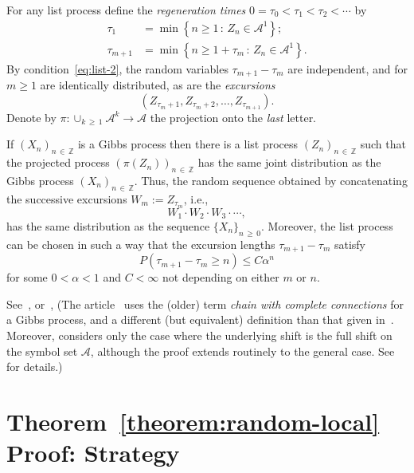 \documentclass[AHL, Unicode, longabstracts, published]{cedram}
\newcommand{\zz}[1]{\mathbb #1}
\begin{document}
For any list process define the \emph{regeneration times} $0=\tau_{0}<\tau_{1}<\tau_{2}<\dotsb$ by
\begin{align*}
\tau_{1}&=\min \left\{n\geq 1\,:\, Z_{n}\in \mathcal{A}^{1}\right\};\\
\tau_{m+1}&=\min \left\{n\geq 1+\tau_{m}\,:\, Z_{n}\in \mathcal{A}^{1}\right\}.
\end{align*}
By condition~\eqref{eq:list-2}, the random variables $\tau_{m+1}-\tau_{m}$ are independent, and for $m\geq 1$ are identically distributed, as are the \emph{excursions}
\[
\left(Z_{\tau_{m}+1},Z_{\tau_{m}+2},\dotsc,Z_{\tau_{m+1}}\right).
\]
Denote by $\pi :\cup_{k\,\geq\,1}\mathcal{A}^{k} \rightarrow \mathcal{A}$ the projection onto the \emph{last} letter.

\begin{prop}\label{proposition:regeneration}
If $(X_{n})_{n\,\in\,\zz{Z}}$ is a Gibbs process then there is a list process $(Z_{n})_{n\,\in\,\zz{Z}}$ such that the projected process $(\pi (Z_{n}))_{n\,\in\,\zz{Z}}$ has the same joint distribution as the Gibbs process $(X_{n})_{n\,\in\,\zz{Z}}$. Thus, the random sequence obtained by concatenating the successive excursions $W_{m}:=Z_{\tau_{m}}$, i.e.,
\[
W_{1}\cdot W_{2}\cdot W_{3}\cdot\dotsb,
\]
has the same distribution as the sequence $\{X_{n} \}_{n\, \geq\,0}$. Moreover, the list process can be chosen in such a way that the excursion lengths $\tau_{m+1}-\tau_{m}$ satisfy
\begin{equation}\label{eq:exp-regeneration}
P (\tau_{m+1}-\tau_{m}\geq n)\leq C\alpha^{n}
\end{equation}
for some $0<\alpha <1$ and $C<\infty$ not depending on either $m$ or $n$.
\end{prop}

See~\cite[Theorem~1]{lalley:regeneration}, or~\cite[Theorem~4.1.]{comets-et-al}, (The article~\cite{lalley:regeneration} uses the (older) term \emph{chain with complete connections} for a Gibbs process, and a different (but equivalent) definition than that given in~\cite{bowen:book}. Moreover,\cite{lalley:regeneration} considers only the case where the underlying shift is the full shift on the symbol set $\mathcal{A}$, although the proof extends routinely to the general case. See~\cite{li-naud-pan} for details.)



\section{Theorem~\ref{theorem:random-local} Proof: Strategy}\label{sec:heuristics}
\end{document}
